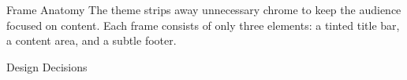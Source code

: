 \begin{frame}{Frame Anatomy}
    The theme strips away unnecessary chrome to keep the audience focused on
    content. Each frame consists of only three elements: a tinted title bar, a
    content area, and a subtle footer.

    
\end{frame}

\begin{frame}{Design Decisions}
    
\end{frame}
